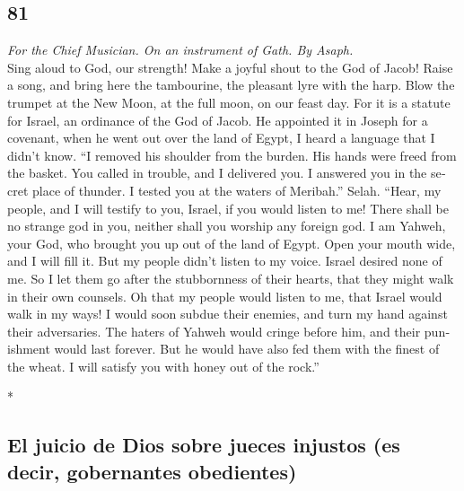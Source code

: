 \begin{paracol}{2}
\begin{otherlanguage}{english}
\hypertarget{section-161}{%
\section{81}\label{section-161}}

\emph{For the Chief Musician. On an instrument of Gath. By Asaph.}\\
 Sing aloud to God, our strength! Make a joyful shout to
the God of Jacob!  Raise a song, and bring here the
tambourine, the pleasant lyre with the harp.  Blow the
trumpet at the New Moon, at the full moon, on our feast day.
 For it is a statute for Israel, an ordinance of the God
of Jacob.  He appointed it in Joseph for a covenant, when
he went out over the land of Egypt, I heard a language that I didn't
know.  ``I removed his shoulder from the burden. His hands
were freed from the basket.  You called in trouble, and I
delivered you. I answered you in the secret place of thunder. I tested
you at the waters of Meribah.'' Selah.  ``Hear, my people,
and I will testify to you, Israel, if you would listen to me!
 There shall be no strange god in you, neither shall you
worship any foreign god.  I am Yahweh, your God, who
brought you up out of the land of Egypt. Open your mouth wide, and I
will fill it.  But my people didn't listen to my voice.
Israel desired none of me.  So I let them go after the
stubbornness of their hearts, that they might walk in their own
counsels.  Oh that my people would listen to me, that
Israel would walk in my ways!  I would soon subdue their
enemies, and turn my hand against their adversaries.  The
haters of Yahweh would cringe before him, and their punishment would
last forever.  But he would have also fed them with the
finest of the wheat. I will satisfy you with honey out of the rock.''

\end{otherlanguage}

\switchcolumn[0]*

\hypertarget{el-juicio-de-dios-sobre-jueces-injustos-es-decir-gobernantes-obedientes}{%
\subsection{El juicio de Dios sobre jueces injustos (es decir,
gobernantes
obedientes)}\label{el-juicio-de-dios-sobre-jueces-injustos-es-decir-gobernantes-obedientes}}


\end{paracol}
